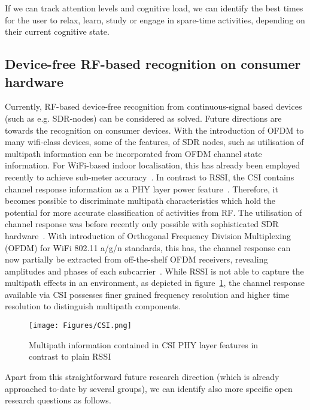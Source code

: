 \documentclass[journal]{IEEEtran}
\begin{document}
\begin{figure*}
If we can track attention levels and cognitive load, we can identify the best times for the user to relax, learn, study or engage in spare-time activities, depending on their current cognitive state.

\subsection{Device-free RF-based recognition on consumer hardware}
Currently, RF-based device-free recognition from continuous-signal based devices (such as e.g. SDR-nodes) can be considered as solved. 
Future directions are towards the recognition on consumer devices. 
With the introduction of OFDM to many wifi-class devices, some of the features, of SDR nodes, such as utilisation of multipath information can be incorporated from OFDM channel state information.
For WiFi-based indoor localisation, this has already been employed recently to achieve sub-meter accuracy~\cite{RFSensing_Wu_2012}.
In contrast to RSSI, the CSI contains channel response information as a PHY layer power feature~\cite{RFSensing_yang_2013}. 
Therefore, it becomes possible to discriminate multipath characteristics which hold the potential for more accurate classification of activities from RF. 
The utilisation of channel response was before recently only possible with sophisticated SDR hardware~\cite{RFSensing_Nerguizian_2006,RFSensing_Patwari_2007,RFSensing_Zhang_2008}. 
With introduction of Orthogonal Frequency Division Multiplexing (OFDM) for WiFi 802.11 a/g/n standards, this has, the channel response can now partially be extracted from off-the-shelf OFDM receivers, revealing amplitudes and phases of each subcarrier~\cite{RFSensing_Halperin_2011}. 
While RSSI is not able to capture the multipath effects in an environment, as depicted in figure~\ref{figureCSI}, the channel response available via CSI possesses finer grained frequency resolution and higher time resolution to distinguish multipath components.

\begin{figure}
    \centering
    \texttt{[image: Figures/CSI.png]}
   \caption{Multipath information contained in CSI PHY layer features in contrast to plain RSSI}
   \label{figureCSI}
\end{figure}

Apart from this straightforward future research direction (which is already approached to-date by several groups), we can identify also more specific open research questions as follows.


\end{figure*}
\end{document}
